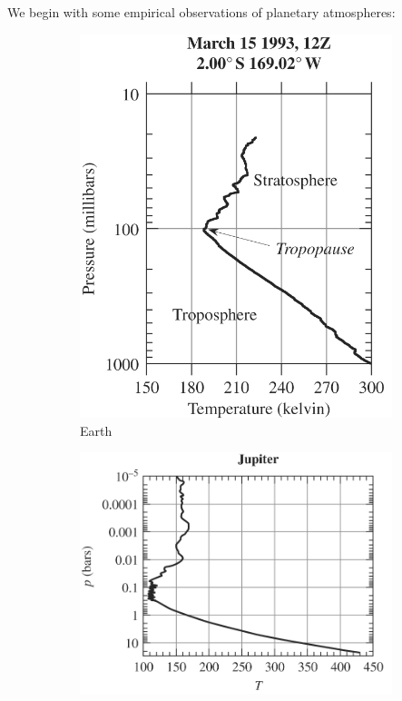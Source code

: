 We begin with some empirical observations of planetary atmospheres:

\begin{figure}[H]
    \begin{subfigure}[t]{0.24\linewidth}
        \includegraphics[width=\linewidth]{Figures/Thermodynamics/Earth Temperature Profile Radiosonde.png}
        \caption{Earth}
    \end{subfigure}
    \begin{subfigure}[t]{0.3\linewidth}
        \includegraphics[width=\linewidth]{Figures/Thermodynamics/Jupiter Radiosonde.png}

\end{subfigure}
\end{figure}
